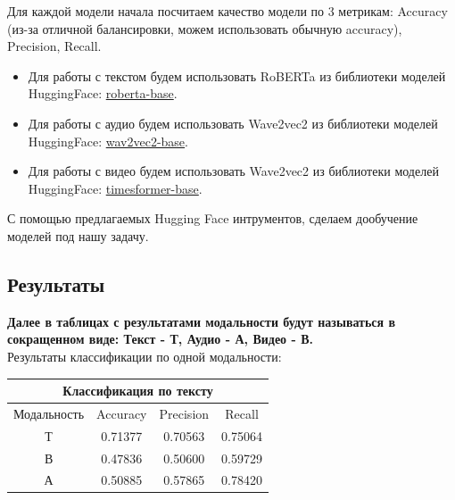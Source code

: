 \documentclass[PMI,VKR]{HSEUniversity}
\begin{document}
Для каждой модели начала посчитаем качество модели по 3 метрикам: Accuracy (из-за отличной балансировки, можем использовать обычную accuracy), Precision, Recall.

\begin{itemize}
    \item Для работы с текстом будем использовать RoBERTa из библиотеки моделей HuggingFace: \href{https://huggingface.co/roberta-base}{roberta-base}.
    \item Для работы с аудио будем использовать Wave2vec2 из библиотеки моделей HuggingFace: \href{https://huggingface.co/facebook/wav2vec2-base}{wav2vec2-base}.
    \item Для работы с видео будем использовать Wave2vec2 из библиотеки моделей HuggingFace: \href{https://huggingface.co/facebook/timesformer-base-finetuned-k400}{timesformer-base}.
\end{itemize}

С помощью предлагаемых Hugging Face интрументов, сделаем дообучение моделей под нашу задачу. \\

\subsection{Результаты}

\textbf{Далее в таблицах с результатами модальности будут называться в сокращенном виде: Текст - Т, Аудио - А, Видео - В.} \\

Результаты классификации по одной модальности: \\

\begin{center}
    \begin{tabular}{ |c||c|c|c|}
        \hline
        \multicolumn{4}{|c|}{Классификация по тексту} \\
        \hline
        Модальность & Accuracy & Precision & Recall   \\
        \hline
        Т           & 0.71377  & 0.70563   & 0.75064  \\
        В           & 0.47836  & 0.50600   & 0.59729  \\
        А           & 0.50885  & 0.57865   & 0.78420  \\
        \hline
    \end{tabular} \\
\end{center}
\end{document}
